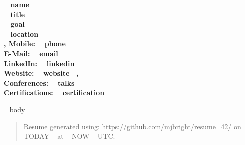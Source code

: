 \documentclass[11pt,english]{article}
\begin{document}

\begin{center}
\huge\bf\color{maincolor} ~{{ name }}~  \\
\small\color{black} ~{{ title }}~ \\
\small\color{black} ~{{ goal }}~ \\
\small\color{black} ~{{ location }}~ \\, \small\color{black} Mobile: ~{{ phone }}~ \\
\vspace{1.4mm}
\small\color{black} E-Mail: ~{{ email }}~ \\
\small\color{black} LinkedIn: ~{{ linkedin }}~ \\
\vspace{1.4mm}
\small\color{black} Website: ~{{ website }}~, \\
\small\color{black} Conferences: ~{{ talks }}~ \\
\vspace{1.4mm}
\small\color{black} Certifications: ~{{ certification }}~
\end{center}
\vspace{0.1mm}
~{{ body }}~

\vfill
\noindent\makebox[\linewidth]{\rule{\paperwidth}{0.4pt}}

\begin{quotation}
\small Resume generated using: https://github.com/mjbright/resume\_42/ on ~{{ TODAY }}~ at ~{{ NOW }}~ UTC.
\end{quotation}
\end{document}

